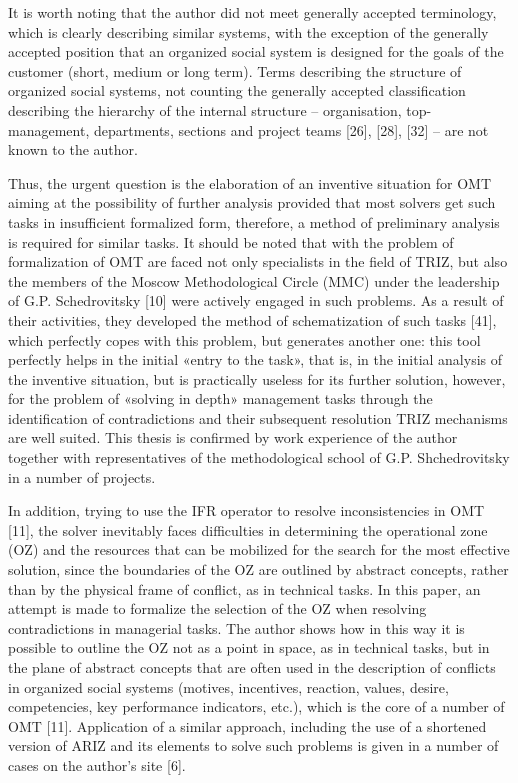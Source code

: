 \documentclass[11pt,a4paper]{book}
\begin{document}
It is worth noting that the author did not meet generally accepted
terminology, which is clearly describing similar systems, with the exception
of the generally accepted position that an organized social system is designed
for the goals of the customer (short, medium or long term). Terms describing
the structure of organized social systems, not counting the generally accepted
classification describing the hierarchy of the internal structure --
organisation, top-management, departments, sections and project teams [26],
[28], [32] -- are not known to the author.

Thus, the urgent question is the elaboration of an inventive situation for OMT
aiming at the possibility of further analysis provided that most solvers get
such tasks in insufficient formalized form, therefore, a method of preliminary
analysis is required for similar tasks. It should be noted that with the
problem of formalization of OMT are faced not only specialists in the field of
TRIZ, but also the members of the Moscow Methodological Circle (MMC) under the
leadership of G.P. Schedrovitsky [10] were actively engaged in such problems.
As a result of their activities, they developed the method of schematization
of such tasks [41], which perfectly copes with this problem, but generates
another one: this tool perfectly helps in the initial «entry to the task»,
that is, in the initial analysis of the inventive situation, but is
practically useless for its further solution, however, for the problem of
«solving in depth» management tasks through the identification of
contradictions and their subsequent resolution TRIZ mechanisms are well
suited. This thesis is confirmed by work experience of the author together
with representatives of the methodological school of G.P. Shchedrovitsky in a
number of projects.

In addition, trying to use the IFR operator to resolve inconsistencies in OMT
[11], the solver inevitably faces difficulties in determining the operational
zone (OZ) and the resources that can be mobilized for the search for the most
effective solution, since the boundaries of the OZ are outlined by abstract
concepts, rather than by the physical frame of conflict, as in technical
tasks. In this paper, an attempt is made to formalize the selection of the OZ
when resolving contradictions in managerial tasks.  The author shows how in
this way it is possible to outline the OZ not as a point in space, as in
technical tasks, but in the plane of abstract concepts that are often used in
the description of conflicts in organized social systems (motives, incentives,
reaction, values, desire, competencies, key performance indicators, etc.),
which is the core of a number of OMT [11]. Application of a similar approach,
including the use of a shortened version of ARIZ and its elements to solve
such problems is given in a number of cases on the author’s site [6].
\end{document}
